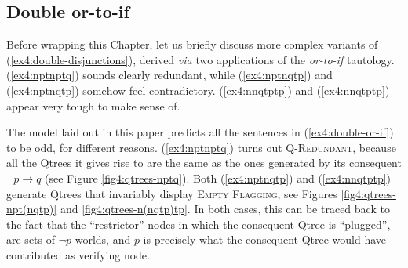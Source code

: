 \begin{exe}
	\label{ex4:incr-containment}
\end{exe}



\subsection{Double or-to-if}\label{sec4:double-or-if}

Before wrapping this Chapter, let us briefly discuss more complex variants of (\ref{ex4:double-disjunctions}), derived \textit{via} two applications of the \textit{or-to-if} tautology. (\ref{ex4:nptnptq}) sounds clearly redundant, while (\ref{ex4:nptnqtp}) and  (\ref{ex4:nptnqtp}) somehow feel contradictory. (\ref{ex4:nnqtptp}) and (\ref{ex4:nnqtptp}) appear very tough to make sense of. 
\begin{exe}
	\ex\label{ex4:double-or-if}
	\begin{xlist}
		\label{ex4:nptnptq}
		\label{ex4:nptnqtp}
		\label{ex4:nnptqtp}
		\label{ex4:nnqtptp}
	\end{xlist}
\end{exe}





The model laid out in this paper predicts all the sentences in (\ref{ex4:double-or-if}) to be odd, for different reasons. (\ref{ex4:nptnptq}) turns out \textsc{Q-Redundant}, because all the Qtrees it gives rise to are the same as the ones generated by its consequent $\neg p \rightarrow q$ (see Figure \ref{fig4:qtrees-nptq}). Both (\ref{ex4:nptnqtp}) and (\ref{ex4:nnqtptp}) generate Qtrees that invariably display \textsc{Empty Flagging}, see Figures \ref{fig4:qtrees-npt(nqtp)} and \ref{fig4:qtrees-n(nqtp)tp}. In both cases, this can be traced back to the fact that the ``restrictor'' nodes in which the consequent Qtree is ``plugged'', are sets of $\neg p$-worlds, and $p$ is precisely what the consequent Qtree would have contributed as verifying node.


